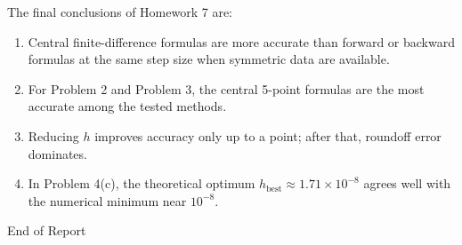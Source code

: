 \documentclass[12pt,a4paper]{article}
\begin{document}
The final conclusions of Homework 7 are:
\begin{enumerate}[label=(\arabic*)]
    \item Central finite-difference formulas are more accurate than forward or backward formulas at the same step size when symmetric data are available.
    \item For Problem 2 and Problem 3, the central 5-point formulas are the most accurate among the tested methods.
    \item Reducing $h$ improves accuracy only up to a point; after that, roundoff error dominates.
    \item In Problem 4(c), the theoretical optimum $h_{\mathrm{best}}\approx 1.71\times 10^{-8}$ agrees well with the numerical minimum near $10^{-8}$.
\end{enumerate}

\vfill
\begin{center}
{\fontsize{28}{32}\selectfont\calligra End of Report}
\end{center}
\vspace*{2em}
\end{document}
